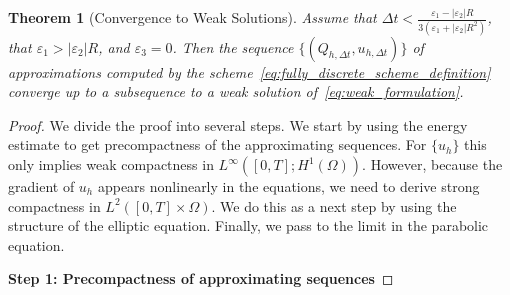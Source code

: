 \documentclass[10pt,letterpaper]{amsart}
\newtheorem{theorem}[lemma]{Theorem}
\theoremstyle{definition}{\newtheorem{definition}[lemma]{Definition}}
\theoremstyle{note}{\newtheorem{claim}{Claim}[section]
\newtheorem*{claim*}{Claim}}
\numberwithin{equation}{section}
\begin{document}
\begin{theorem}[Convergence to Weak Solutions]
Assume that  $\Delta t< \frac{\varepsilon_1 - |\varepsilon_2|R}{3(\varepsilon_1+|\varepsilon_2|R^2)}$, that $\varepsilon_1 > \lvert\varepsilon_2\rvert R$, and $\varepsilon_3=0$. Then the sequence $\{(Q_{h,\Delta t}, u_{h,\Delta t})\}$ of approximations computed by the scheme~\eqref{eq:fully_discrete_scheme_definition} converge up to a subsequence to a weak solution of~\eqref{eq:weak_formulation}.
\end{theorem}
\begin{proof}
	We divide the proof into several steps. We start by using the energy estimate to get precompactness of the approximating sequences. For $\{u_h\}$ this only implies weak compactness in $L^\infty([0,T]; H^1(\Omega))$. However, because the gradient of $u_h$ appears nonlinearly in the equations, we need to derive strong compactness in $L^2([0,T]\times\Omega)$. We do this as a next step by using the structure of the elliptic equation. Finally, we pass to the limit in the parabolic equation.

\medskip	
	
\textbf{Step 1: Precompactness of approximating sequences}
	

\end{proof}
\end{document}
